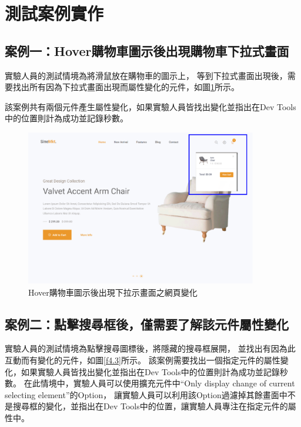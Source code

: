 \section{測試案例實作}\label{s4.2}

\subsection{案例一：Hover購物車圖示後出現購物車下拉式畫面}\label{s4.2.1}
\indent
實驗人員的測試情境為將滑鼠放在購物車的圖示上，
等到下拉式畫面出現後，需要找出所有因為下拉式畫面出現而屬性變化的元件，如圖\ref{f4.2}所示。

該案例共有兩個元件產生屬性變化，如果實驗人員皆找出變化並指出在Dev Tools中的位置則計為成功並記錄秒數。

\begin{figure}[H]
    \centering
    \setlength{\abovecaptionskip}{-5pt}
    \setlength{\belowcaptionskip}{0pt}
    \includegraphics[width=0.9\textwidth]{picture/experiment/test-environment-no1.png}
    \caption{Hover購物車圖示後出現下拉示畫面之網頁變化}
    \label{f4.2}
\end{figure}

\subsection{案例二：點擊搜尋框後，僅需要了解該元件屬性變化}\label{s4.2.2}
\indent
實驗人員的測試情境為點擊搜尋圖標後，將隱藏的搜尋框展開，
並找出有因為此互動而有變化的元件，如圖\ref{f4.3}所示。
該案例需要找出一個指定元件的屬性變化，如果實驗人員皆找出變化並指出在Dev Tools中的位置則計為成功並記錄秒數。
在此情境中，實驗人員可以使用擴充元件中``Only display change of current selecting element''的Option，
讓實驗人員可以利用該Option過濾掉其餘畫面中不是搜尋框的變化，並指出在Dev Tools中的位置，讓實驗人員專注在指定元件的屬性中。

